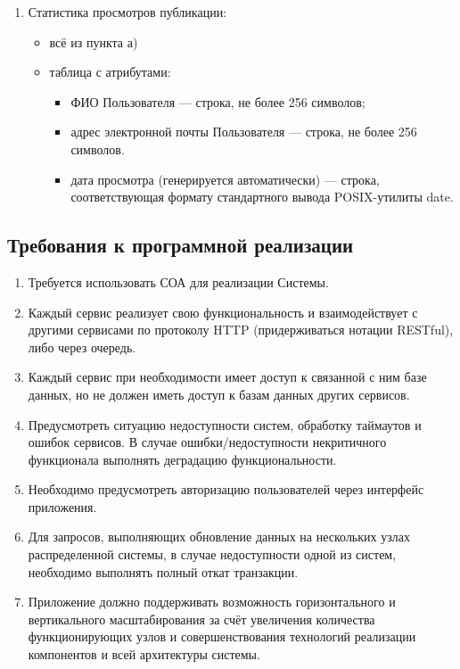 \documentclass{bmstu-gost-7-32}
\begin{document}
\begin{enumerate}
	\item Статистика просмотров публикации:
	\begin{itemize}
		\item всё из пункта а)
		\item таблица с атрибутами:
		\begin{itemize}
			\item ФИО Пользователя — строка, не более 256 символов;
			\item адрес электронной почты Пользователя — строка, не более 256 символов.
			\item дата просмотра (генерируется автоматически) — строка, соответствующая формату стандартного вывода POSIX-утилиты date.
		\end{itemize}
	\end{itemize}
\end{enumerate}

\subsection{Требования к программной реализации}

\begin{enumerate}
	\item Требуется использовать СОА для реализации Системы.
	\item Каждый сервис реализует свою функциональность и взаимодействует с другими сервисами по протоколу HTTP (придерживаться нотации RESTful), либо через очередь.
	\item Каждый сервис при необходимости имеет доступ к связанной с ним базе данных, но не должен иметь доступ к базам данных других сервисов.
	\item Предусмотреть ситуацию недоступности систем, обработку таймаутов и ошибок сервисов.
	В случае ошибки/недоступности некритичного функционала выполнять деградацию функциональности.
	\item Необходимо предусмотреть авторизацию пользователей через
	интерфейс приложения.
	\item  Для запросов, выполняющих обновление данных на нескольких узлах распределенной системы, в случае недоступности одной из систем, необходимо выполнять полный откат транзакции.
	\item Приложение должно поддерживать возможность горизонтального и вертикального масштабирования за счёт увеличения количества функционирующих узлов и совершенствования технологий реализации компонентов и всей архитектуры системы.
\end{enumerate}
\end{document}
